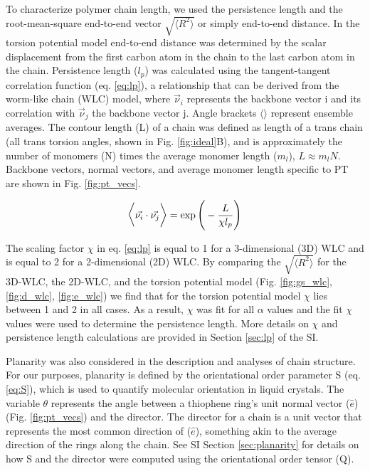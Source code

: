 To characterize polymer chain length, we used the persistence length and the root-mean-square end-to-end vector $\sqrt{\big \langle R^2 \big \rangle}$ or simply end-to-end distance. In the torsion potential model end-to-end distance was determined by the scalar displacement from the first carbon atom in the chain to the last carbon atom in the chain. Persistence length ($l_p$) was calculated using the tangent-tangent correlation function (eq. \ref{eq:lp}), a relationship that can be derived from the worm-like chain (WLC) model, where $\vec{\nu}_i$ represents the backbone vector i and its correlation with $\vec{\nu}_j$ the backbone vector j. Angle brackets $\big \langle \big \rangle$ represent ensemble averages. The contour length (L) of a chain was defined as length of a trans chain (all trans torsion angles, shown in Fig. \ref{fig:ideal}B), and is approximately the number of monomers (N) times the average monomer length ($m_l$), $L \approx m_lN$. Backbone vectors, normal vectors, and average monomer length specific to PT are shown in Fig. \ref{fig:pt_vecs}.

\begin{equation}
\Large
\Big \langle \large \Vec{\nu_i} \cdot \Vec{\nu_j} \Big \rangle = \exp{\bigg(-\frac{L}{\chi l_p}\bigg)}
\label{eq:lp}
\end{equation}

The scaling factor $\chi$ in eq. \ref{eq:lp} is equal to 1 for a 3-dimensional (3D) WLC and is equal to 2 for a 2-dimensional (2D) WLC.\cite{Meyer2016} By comparing the $\sqrt{\big \langle R^2 \big \rangle}$ for the 3D-WLC, the 2D-WLC, and the torsion potential model (Fig. \ref{fig:gs_wlc}, \ref{fig:d_wlc}, \ref{fig:e_wlc}) we find that for the torsion potential model $\chi$ lies between 1 and 2 in all cases. As a result, $\chi$ was fit for all $\alpha$ values and the fit $\chi$ values were used to determine the persistence length. More details on $\chi$ and persistence length calculations are provided in Section \ref{sec:lp} of the SI.

Planarity was also considered in the description and analyses of chain structure. For our purposes, planarity is defined by the orientational order parameter S (eq. \ref{eq:S}),\cite{Allen2017} which is used to quantify molecular orientation in liquid crystals. The variable $\theta$ represents the angle between a thiophene ring's unit normal vector ($\hat{e}$) (Fig. \ref{fig:pt_vecs}) and the director. The director for a chain is a unit vector that represents the most common direction of ($\hat{e}$), something akin to the average direction of the rings along the chain. See SI Section \ref{sec:planarity} for details on how S and the director were computed using the orientational order tensor (Q).

